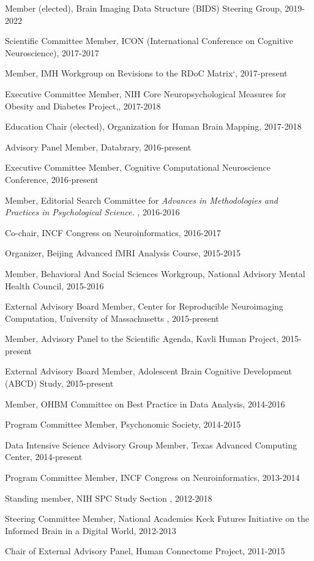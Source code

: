 \documentclass[10pt, letterpaper]{article}
\begin{document}
Member (elected), Brain Imaging Data Structure (BIDS) Steering Group, 2019-2022 

Scientific Committee Member, ICON (International Conference on Cognitive Neuroscience), 2017-2017 

Member, IMH Workgroup on Revisions to the RDoC Matrix`, 2017-present 

Executive Committee Member, NIH Core Neuropsychological Measures for Obesity and Diabetes Project,, 2017-2018 

Education Chair (elected), Organization for Human Brain Mapping, 2017-2018 

Advisory Panel Member, Databrary, 2016-present 

Executive Committee Member, Cognitive Computational Neuroscience Conference, 2016-present 

Member, Editorial Search Committee for \emph{Advances in Methodologies and Practices in Psychological Science.} , 2016-2016 

Co-chair, INCF Congress on Neuroinformatics, 2016-2017 

Organizer, Beijing Advanced fMRI Analysis Course, 2015-2015 

Member, Behavioral And Social Sciences Workgroup, National Advisory Mental Health Council, 2015-2016 

External Advisory Board Member, Center for Reproducible Neuroimaging Computation, University of Massachusetts , 2015-present 

Member, Advisory Panel to the Scientific Agenda, Kavli Human Project, 2015-present 

External Advisory Board Member, Adolescent Brain Cognitive Development (ABCD) Study, 2015-present 

Member, OHBM Committee on Best Practice in Data Analysis, 2014-2016 

Program Committee Member, Psychonomic Society, 2014-2015 

Data Intensive Science Advisory Group Member, Texas Advanced Computing Center, 2014-present 

Program Committee Member, INCF Congress on Neuroinformatics, 2013-2014 

Standing member, NIH SPC Study Section , 2012-2018 

Steering Committee Member, National Academies Keck Futures Initiative on the Informed Brain in a Digital World, 2012-2013 

Chair of External Advisory Panel, Human Connectome Project, 2011-2015 
\end{document}
